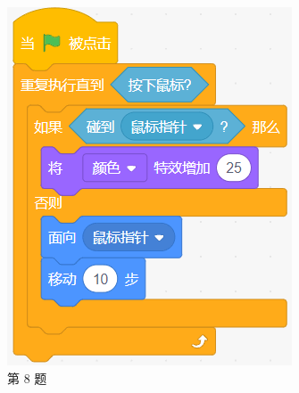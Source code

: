 \documentclass[10pt, a4paper]{article}
\begin{document}
\begin{enumerate}
        \begin{figure}[htbp]
            \centering
            \begin{minipage}[t]{.18\textwidth}
                \centering
                \includegraphics[width=\textwidth]{figure/8.png}
                \caption*{第 8 题}
            \end{minipage}
            \begin{minipage}[t]{.168\textwidth}
                \centering

\end{minipage}
\end{figure}
\end{enumerate}
\end{document}
